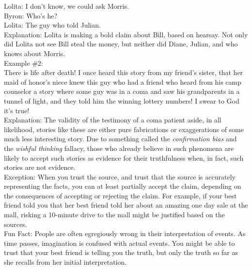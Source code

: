 \documentclass[a4paper,12pt,single,pdftex]{scrartcl}
\begin{document}
    
      Lolita:  I don’t know, we could ask Morris.
    \\

    
      Byron: Who’s he?
    \\

    
      Lolita: The guy who told Julian.
    \\

    
      Explanation: Lolita is making a bold claim about Bill, based on hearsay.  Not only did Lolita not see Bill steal the money, but neither did Diane, Julian, and who knows about Morris.
    \\

    
      Example \#2:
    \\

    
      There is life after death!  I once heard this story from my friend’s sister, that her maid of honor’s niece knew this guy who had a friend who heard from his camp counselor a story where some guy was in a coma and saw his grandparents in a tunnel of light, and they told him the winning lottery numbers!  I swear to God it’s true!
    \\

    
      Explanation: The validity of the testimony of a coma patient aside, in all likelihood, stories like these are either pure fabrications or exaggerations of some much less interesting story.  Due to something called the {\it confirmation bias} and the {\it wishful thinking}  fallacy, those who already believe in such phenomena are likely to accept such stories as evidence for their truthfulness when, in fact, such stories are not evidence.
    \\

    
      Exception: When you trust the source, and trust that the source is accurately representing the facts, you can at least partially accept the claim, depending on the consequences of accepting or rejecting the claim.  For example, if your best friend told you that her best friend told her about an amazing one day sale at the mall, risking a 10-minute drive to the mall might be justified based on the sources.
    \\

    
      Fun Fact: People are often egregiously wrong in their interpretation of events.  As time passes, imagination is confused with actual events.  You might be able to trust that your best friend is telling you the truth, but only the truth so far as she recalls from her initial interpretation.
    \\
\end{document}
